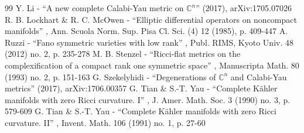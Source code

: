 \documentclass[10pt]{amsart}
\theoremstyle{plain}
\theoremstyle{definition}
\begin{document}
\begin{thebibliography}{99}
 Y. Li - “A new complete Calabi-Yau metric on $\mathbb{C}^n$” (2017), arXiv:1705.07026
 R. B. Lockhart \& R. C. McOwen - “Elliptic differential operators on noncompact manifolds” , Ann. Scuola Norm. Sup. Pisa Cl. Sci. (4) 12 (1985), p. 409-447
 A. Ruzzi - “Fano symmetric varieties with low rank” , Publ. RIMS, Kyoto Univ. 48 (2012) no. 2, p. 235-278
 M. B. Stenzel - “Ricci-flat metrics on the complexification of a compact rank one symmetric space” , Manuscripta Math. 80 (1993) no. 2, p. 151-163
 G. Szekelyhidi - “Degenerations of $\mathbb{C}^n$ and Calabi-Yau metrics” (2017), arXiv:1706.00357
 G. Tian \& S.-T. Yau - “Complete Kähler manifolds with zero Ricci curvature. I” , J. Amer. Math. Soc. 3 (1990) no. 3, p. 579-609
 G. Tian \& S.-T. Yau - “Complete Kähler manifolds with zero Ricci curvature. II” , Invent. Math. 106 (1991) no. 1, p. 27-60
\end{thebibliography}
\end{document}
